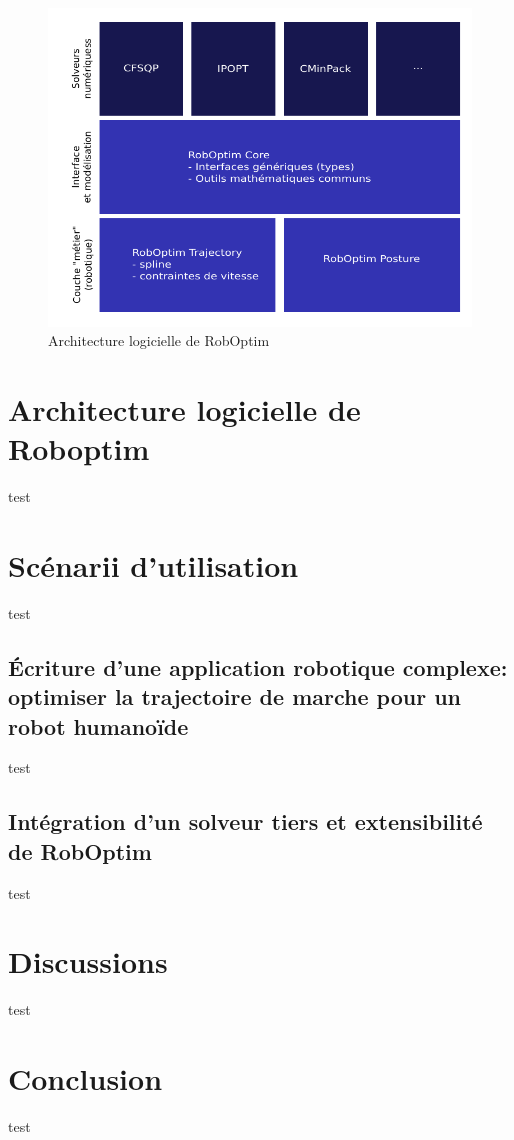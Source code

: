 \begin{figure}
  \begin{center}
    \includegraphics{src/chap1-roboptim/roboptim-architecture.pdf}
  \end{center}
  \caption{Architecture logicielle de RobOptim}
\end{figure}




\section{Architecture logicielle de Roboptim}

test

\section{Scénarii d'utilisation}

test

\subsection[FIXME]{\'Ecriture d'une application robotique complexe: optimiser la trajectoire de marche pour un robot humanoïde}

test

\subsection{Intégration d'un solveur tiers et extensibilité de RobOptim}

test

\section{Discussions}

test

\section{Conclusion}

test
